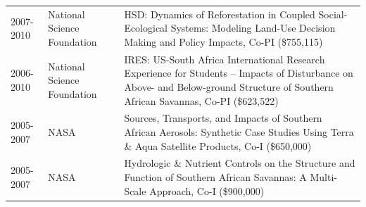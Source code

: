 \begin{longtable}{p{1.75cm}>{\raggedright}p{}p{12cm}}
2007-2010 & National Science Foundation & HSD: Dynamics of Reforestation in Coupled Social-Ecological Systems: Modeling Land-Use Decision Making and Policy Impacts, Co-PI (\$755,115) \\ 
2006-2010 & National Science Foundation & IRES: US-South Africa International Research Experience for Students -- Impacts of Disturbance on Above- and Below-ground Structure of Southern African Savannas, Co-PI (\$623,522) \\ 
2005-2007 & NASA & Sources, Transports, and Impacts of Southern African Aerosols: Synthetic Case Studies Using Terra \& Aqua Satellite Products, Co-I (\$650,000) \\ 
2005-2007 & NASA & Hydrologic \& Nutrient Controls on the Structure and Function of Southern African Savannas: A Multi-Scale Approach, Co-I (\$900,000) \\ 

\end{longtable}

